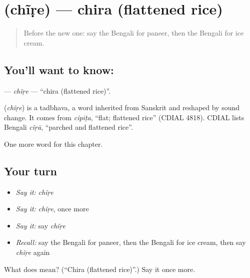 \section[\texorpdfstring{\bn{চিঁড়ে} (chĩṛe)}{চিঁড়ে (chĩṛe)}]{ (chĩṛe) — chira (flattened rice)}

\label{lesson:BN-C257-chire}



\begin{quote}
Before the new one: say the Bengali for paneer, then the Bengali for ice cream.
\end{quote}

\subsection*{You'll want to know: }
\textbf{} — \emph{chĩṛe} — \textquotedblleft{}chira (flattened rice)\textquotedblright{}.

\begin{cousinweb}
\textbf{} (\emph{chĩṛe}) is a tadbhava, a word inherited from Sanskrit and reshaped by sound change. It comes from \emph{cipiṭa}, \textquotedblleft{}flat; flattened rice\textquotedblright{} (CDIAL 4818). CDIAL lists Bengali \emph{cĩṛā}, \textquotedblleft{}parched and flattened rice\textquotedblright{}.
\end{cousinweb}

\begin{grammarlens}[title={What you've built}]
One more word for this chapter.
\end{grammarlens}

\subsection*{Your turn}
\begin{itemize}
\raggedright
  \item \emph{Say it:} \emph{chĩṛe}
  \item \emph{Say it:} \emph{chĩṛe}, once more
  \item \emph{Say it:} say \emph{chĩṛe}
  \item \emph{Recall:} say the Bengali for paneer, then the Bengali for ice cream, then say \emph{chĩṛe} again
\end{itemize}

\begin{tcolorbox}[breakable,colback=teal!4,colframe=teal!35!black,title={Before you move on}]
What does  mean? (\textquotedblleft{}Chira (flattened rice)\textquotedblright{}.) Say it once more.
\end{tcolorbox}
